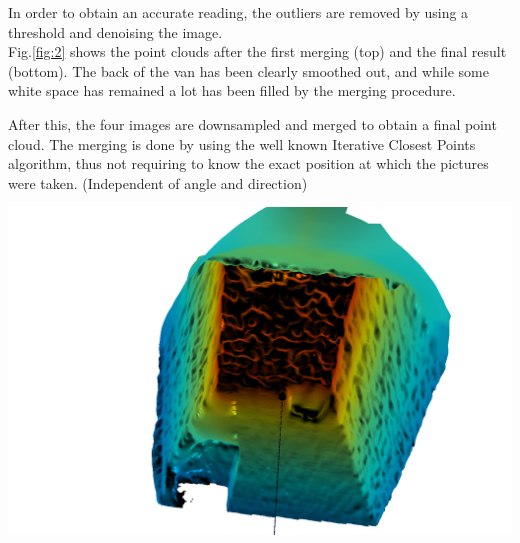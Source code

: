 \documentclass[a0paper,portrait]{baposter}
\begin{document}
\begin{poster}
{\begin{minipage}[h]{0.49\textwidth}
	In order to obtain an accurate reading, the outliers are removed by using a threshold and denoising the image. \\
	
	Fig.\ref{fig:2} shows the point clouds after the first merging (top) and the final result (bottom). The back of the van has been clearly smoothed out, and while some white space has remained a lot has been filled by the merging procedure.
	
	After this, the four images are downsampled and merged to obtain a final point cloud. The merging is done by using the well known Iterative Closest Points algorithm, thus not requiring to know the exact position at which the pictures were taken. (Independent of angle and direction)
	
	\begin{center}
		\includegraphics[width=0.8\linewidth]{van100.png}
		\label{fig:1}
	\end{center}
	
\end{minipage}%

}
\end{poster}
\end{document}
